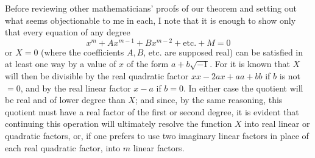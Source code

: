 Before reviewing other mathematicians’ proofs of our theorem and setting out what seems objectionable to me in each, I note that it is enough to show only that every equation of any degree
\[
x^m+Ax^{m-1}+Bx^{m-2}+\text{etc.}+M=0
\]
or $X=0$ (where the coefficients $A,B$, etc. are supposed real) can be satisfied in at least one way by a value of $x$ of the form $a+b\sqrt{-1}$. For it is known that $X$ will then be divisible by the real quadratic factor $xx-2ax+aa+bb$ if $b$ is not $=0$, and by the real linear factor $x-a$ if $b=0$. In either case the quotient will be real and of lower degree than $X$; and since, by the same reasoning, this quotient must have a real factor of the first or second degree, it is evident that continuing this operation will ultimately resolve the function $X$ into real linear or quadratic factors, or, if one prefers to use two imaginary linear factors in place of each real quadratic factor, into $m$ linear factors.
